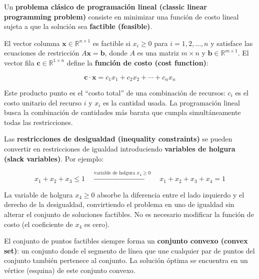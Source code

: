 \documentclass[12pt]{article}
\begin{document}
Un \textbf{problema cl\'asico de programaci\'on lineal (classic linear
programming problem)} consiste en minimizar una funci\'on de costo lineal
sujeta a que la soluci\'on sea \textbf{factible (feasible)}.

El vector columna $\mathbf{x} \in \mathbb{R}^{n \times 1}$ es factible si
$x_i \geq 0$ para $i = 1, 2, \ldots, n$ y satisface las ecuaciones de
restricci\'on $A\mathbf{x} = \mathbf{b}$, donde $A$ es una matriz $m \times n$
y $\mathbf{b} \in \mathbb{R}^{m \times 1}$. El vector fila
$\mathbf{c} \in \mathbb{R}^{1 \times n}$ define la \textbf{funci\'on de costo
(cost function)}:

\begin{equation}
  \mathbf{c} \cdot \mathbf{x} = c_1 x_1 + c_2 x_2 + \cdots + c_n x_n
\end{equation}

\begin{intuicionmat}
Este producto punto es el ``costo total'' de una combinaci\'on de recursos:
$c_i$ es el costo unitario del recurso $i$ y $x_i$ es la cantidad usada.
La programaci\'on lineal busca la combinaci\'on de cantidades m\'as barata
que cumpla simult\'aneamente todas las restricciones.
\end{intuicionmat}

Las \textbf{restricciones de desigualdad (inequality constraints)} se pueden
convertir en restricciones de igualdad introduciendo \textbf{variables de
holgura (slack variables)}. Por ejemplo:

\begin{equation}
  x_1 + x_2 + x_3 \leq 1
  \quad \xrightarrow{\text{variable de holgura } x_4 \geq 0} \quad
  x_1 + x_2 + x_3 + x_4 = 1
\end{equation}

\begin{intuicionmat}
La variable de holgura $x_4 \geq 0$ absorbe la diferencia entre el lado
izquierdo y el derecho de la desigualdad, convirtiendo el problema en uno
de igualdad sin alterar el conjunto de soluciones factibles. No es necesario
modificar la funci\'on de costo (el coeficiente de $x_4$ es cero).
\end{intuicionmat}

El conjunto de puntos factibles siempre forma un \textbf{conjunto convexo
(convex set)}: un conjunto donde el segmento de l\'inea que une cualquier
par de puntos del conjunto tambi\'en pertenece al conjunto. La soluci\'on
\'optima se encuentra en un v\'ertice (esquina) de este conjunto convexo.
\end{document}

